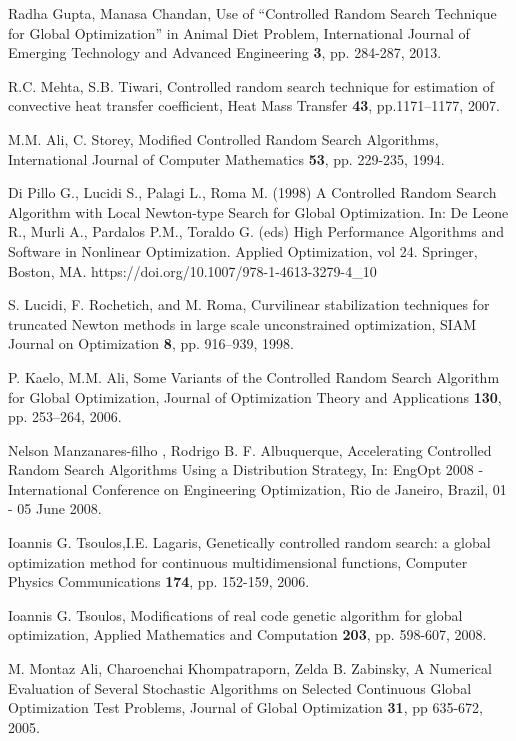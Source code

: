 \documentclass[symmetry,article,submit,moreauthors,pdftex]{mdpi}
\begin{document}
\begin{thebibliography}{10}
Radha Gupta, Manasa Chandan, Use of \textquotedblleft Controlled
Random Search Technique for Global Optimization\textquotedblright{}
in Animal Diet Problem, International Journal of Emerging Technology
and Advanced Engineering \textbf{3}, pp. 284-287, 2013.

R.C. Mehta, S.B. Tiwari, Controlled random search
technique for estimation of convective heat transfer coefficient,
Heat Mass Transfer \textbf{43}, pp.1171--1177, 2007.

M.M. Ali, C. Storey, Modified Controlled Random
Search Algorithms, International Journal of Computer Mathematics \textbf{53},
pp. 229-235, 1994.

Di Pillo G., Lucidi S., Palagi L., Roma M. (1998)
A Controlled Random Search Algorithm with Local Newton-type Search
for Global Optimization. In: De Leone R., Murli A., Pardalos P.M.,
Toraldo G. (eds) High Performance Algorithms and Software in Nonlinear
Optimization. Applied Optimization, vol 24. Springer, Boston, MA.
https://doi.org/10.1007/978-1-4613-3279-4\_10

S. Lucidi, F. Rochetich, and M. Roma, Curvilinear
stabilization techniques for truncated Newton methods in large scale
unconstrained optimization, SIAM Journal on Optimization \textbf{8},
pp. 916--939, 1998.

P. Kaelo, M.M. Ali, Some Variants of the Controlled
Random Search Algorithm for Global Optimization, Journal of Optimization
Theory and Applications \textbf{130}, pp. 253--264, 2006.

Nelson Manzanares-filho , Rodrigo B. F. Albuquerque,
Accelerating Controlled Random Search Algorithms Using a Distribution
Strategy, In: EngOpt 2008 - International Conference on Engineering
Optimization, Rio de Janeiro, Brazil, 01 - 05 June 2008. 

 Ioannis G. Tsoulos,I.E. Lagaris, Genetically controlled random search: a global optimization method for continuous multidimensional functions, Computer Physics Communications \textbf{174}, pp. 152-159, 2006.

Ioannis G. Tsoulos, Modifications of real code
genetic algorithm for global optimization, Applied Mathematics and
Computation \textbf{203}, pp. 598-607, 2008.

M. Montaz Ali, Charoenchai Khompatraporn, Zelda B.
Zabinsky, A Numerical Evaluation of Several Stochastic Algorithms
on Selected Continuous Global Optimization Test Problems, Journal
of Global Optimization \textbf{31}, pp 635-672, 2005. 


\end{thebibliography}
\end{document}
